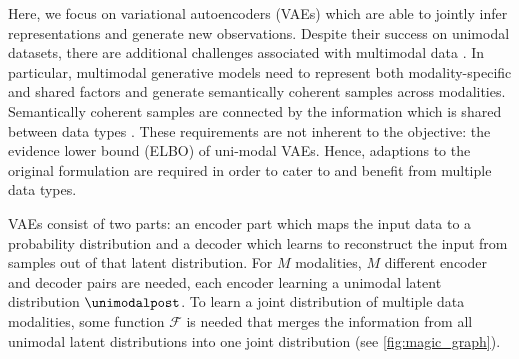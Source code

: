 





Here, we focus on variational autoencoders (VAEs) \parencite{kingma_auto-encoding_2014,rezende_stochastic_2014} which are able to jointly infer representations and generate new observations.
Despite their success on unimodal datasets, there are additional challenges associated with multimodal data \parencite{suzuki_joint_2016, vedantam_generative_2018}.
In particular, multimodal generative models need to represent both modality-specific and shared factors and generate semantically coherent samples across modalities.
Semantically coherent samples are connected by the information which is shared between data types \parencite{shi_variational_2019}.
These requirements are not inherent to the objective: the evidence lower bound (ELBO) of uni-modal VAEs.
Hence, adaptions to the original formulation are required in order to cater to and benefit from multiple data types.





VAEs consist of two parts: an encoder part which maps the input data to a probability distribution and a decoder which learns to reconstruct the input from samples out of that latent distribution.
For $M$ modalities, $M$ different encoder and decoder pairs are needed, each encoder learning a unimodal latent distribution $\unimodalpost$.
To learn a joint distribution of multiple data modalities, some function $\mathcal{F}$ is needed that merges the information from all unimodal latent distributions into one joint distribution (see \cref{fig:magic_graph}).


